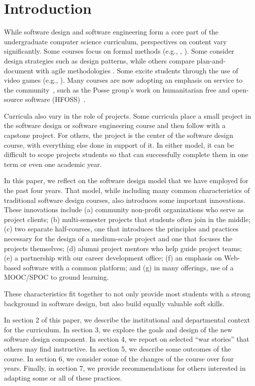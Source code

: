 
\section{Introduction}

While software design and software engineering form a core part of
the undergraduate computer science curriculum, perspectives on 
content vary significantly.  Some courses
focus on formal methods (e.g., \cite{liu-2009}, \cite{garcia-2014}).
Some consider design strategies such as design patterns, while others
compare plan-and-document with agile methodologies
\cite{gestwicki-2018}.  Some excite students through the use of
video games (e.g., \cite{wolz-2007}).  Many courses are now adopting
an emphasis on service to the community~\cite{hfoss-2018}, 
such as the Posse group's work on
humanitarian free and open-source software (HFOSS)~\cite{posse-2018}.

Curricula also vary in the role of projects.  Some curricula place
a small project in the software design or software engineering
course and then follow with a capstone project.  For others,
the project is the center of the software design course, with
everything else done in support of it. In either model, it can be difficult to 
scope projects students so that can successfully complete them
in one term or even one academic year.

In this paper, we reflect on the software design model that we have
employed for the past four years.  That model, while including many
common characteristics of traditional software design courses, also
introduces some important innovations.  These innovations include
(a) community non-profit organizations who serve as project clients;
(b) multi-semester projects that students often join in the middle;
(c) two separate half-courses, one that introduces
the principles and practices necessary for the design of a medium-scale
project and one that focuses the projects themselves; 
(d) alumni project mentors who help guide project teams; 
(e) a partnership with our career development office; 
(f) an emphasis on Web-based software with a common platform; and 
(g) in many offerings, use of a MOOC/SPOC to ground learning.

These characteristics fit together to not only provide
most students with a strong background in software design, but also
build equally valuable soft skills.

In section 2 of this paper, we describe the institutional and
departmental context for the curriculum.  In section 3, we explore
the goals and design of the new software design component.  In
section 4, we report on selected ``war stories'' that others may
find instructive.  In section 5, we describe some outcomes of the
course.  In section 6, we consider some of the changes of the course
over four years.  Finally, in section 7, we provide recommendations
for others interested in adapting some or all of these practices.

